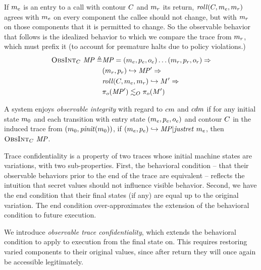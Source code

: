 \documentclass[acmsmall,review,anonymous]{acmart}\settopmatter{printfolios=true,printccs=false,printacmref=false}
\begin{document}
      If \(m_e\) is an entry to a call with contour \(C\) and
      \(m_r\) its return, \(\mathit{roll}(C,m_e,m_r)\)
      agrees with \(m_e\) on every component the callee should not change,
      but with \(m_r\) on those components that it is permitted to change.
      So the observable behavior that follows is the idealized behavior to
      which we compare the trace from \(m_r\), which must prefix it (to
      account for premature halts due to policy violations.)
      \[\begin{split}
        \text{\sc ObsInt}_C ~ \mathit{MP} \triangleq
          & \mathit{MP} = (m_e,p_e,o_e) \dots
            (m_r,p_r,o_r) \Rightarrow \\
        & (m_r,p_r) \hookrightarrow \mathit{MP}' \Rightarrow \\
        & \mathit{roll}(C,m_e,m_r) \hookrightarrow M' \Rightarrow \\
        & \pi_o(\mathit{MP}') \lesssim_O \pi_o(M')
      \end{split}\]


      A system enjoys {\em observable integrity} with regard to \(cm\)
      and  \(\mathit{cdm}\) if for any initial state \(m_0\) and each
      transition with entry state \((m_e,p_e,o_e)\) and
      contour \(C\) in the induced trace from
      \((m_0,\mathit{pinit}(m_0))\), if
      \((m_e,p_e) \hookrightarrow \mathit{MP} | \mathit{justret}\ m_e\),
      then \(\text{\sc ObsInt}_C ~ \mathit{MP}\).


      Trace confidentiality is a property of two traces whose initial machine
      states are variations, with two sub-properties. First, the behavioral
      condition -- that their observable behaviors prior to the end of the
      trace are equivalent -- reflects the intuition that secret values should
      not influence visible behavior. Second, we have the end condition that
      their final states (if any) are equal up to the original variation. The
      end condition over-approximates the extension of the behavioral condition
      to future execution.

      We introduce {\em observable trace confidentiality}, which extends the
      behavioral condition to apply to execution from the final state on.
      This requires restoring varied components to their original values,
      since after return they will once again be accessible legitimately.
\end{document}
